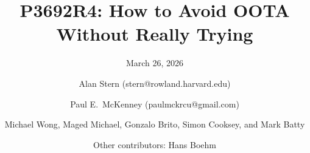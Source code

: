 

\usepackage[T1]{fontenc} %
\usepackage{textcomp} %

\usepackage{microtype}

\usepackage{lscape}
\usepackage{fancyhdr}
\usepackage{subfigure}
\usepackage{url}
\usepackage{graphics}
\usepackage{ifthen}
\usepackage{float}
\usepackage{listings}
\lstset{basicstyle=\ttfamily}



\DeclareUrlCommand\email{}

\pagestyle{plain}


\usepackage{soul}
\newcommand{\hlg}[1]{\sethlcolor{lightgreen}\hl{#1}\sethlcolor{yellow}}
\newcommand{\hlr}[1]{\sethlcolor{red}\hl{#1}\sethlcolor{yellow}}
\newcommand{\hlb}[1]{\sethlcolor{lightblue}\hl{#1}\sethlcolor{yellow}}


\title{P3692R4: How to Avoid OOTA Without Really Trying}
\subtitle{March 26, 2026}

\newcommand{\co}[1]{\lstinline[breaklines=yes,breakatwhitespace=yes]{#1}}

\author{
Alan Stern (stern@rowland.harvard.edu) \and
Paul E.~McKenney (paulmckrcu@gmail.com) \and
Michael Wong,
Maged Michael,
Gonzalo Brito,
Simon Cooksey, and
Mark Batty \and
Other contributors: Hans Boehm}

